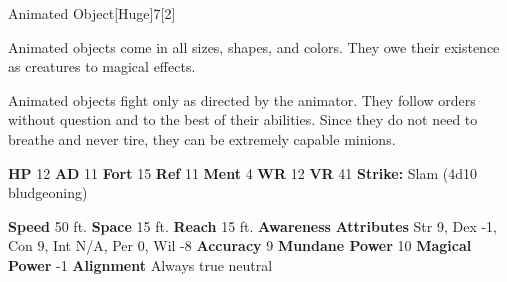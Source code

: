   
  \begin{monsection}{Animated Object}[Huge]{7}[2]
    \vspace{-1em}\vspace{-1em}
    \vspace{0em}

    
    Animated objects come in all sizes, shapes, and colors. They owe their existence as creatures to magical effects.

    Animated objects fight only as directed by the animator. They follow orders without question and to the best of their abilities. Since they do not need to breathe and never tire, they can be extremely capable minions.
  
    

    \begin{spellcontent}
      \begin{spelltargetinginfo}
        \pari \textbf{HP} 12 \monsep
          \textbf{AD} 11 \monsep
          \textbf{Fort} 15 \monsep
          \textbf{Ref} 11 \monsep
          \textbf{Ment} 4
        \pari \textbf{WR} 12 \monsep
        \textbf{VR} 41
        \pari \textbf{Strike:}
            Slam  (4d10 bludgeoning)
      \end{spelltargetinginfo}
    \end{spellcontent}
    \begin{monsterfooter}
      \pari \textbf{Speed} 50 ft. \monsep
        \textbf{Space} 15 ft. \monsep
        \textbf{Reach} 15 ft.
      \pari \textbf{Awareness} 
      \pari \textbf{Attributes}
        Str 9, Dex -1,
        Con 9, Int N/A,
        Per 0, Wil -8
      \pari \textbf{Accuracy} 9 \monsep
        \textbf{Mundane Power} 10 \monsep
      \textbf{Magical Power} -1
      \pari \textbf{Alignment} Always true neutral
    \end{monsterfooter}
  \end{monsection}
  
